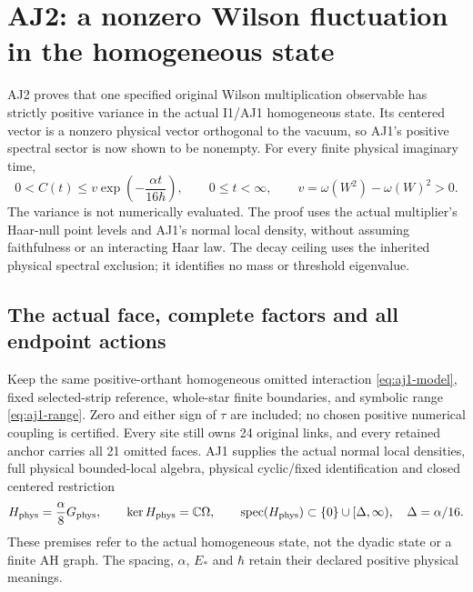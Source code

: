 \section{AJ2: a nonzero Wilson fluctuation in the homogeneous state\workstar}
\label{sec:aj2}
AJ2 proves that one specified original Wilson multiplication observable has strictly positive variance in the actual I1/AJ1 homogeneous state. Its centered vector is a nonzero physical vector orthogonal to the vacuum, so AJ1's positive spectral sector is now shown to be nonempty. For every finite physical imaginary time,
\begin{equation}
 0<C(t)\le v\exp\!\left(-\frac{\alpha t}{16\hbar}\right),
 \qquad0\le t<\infty,
 \qquad v=\omega(W^2)-\omega(W)^2>0.
 \label{eq:aj2-correlation}
\end{equation}
The variance is not numerically evaluated. The proof uses the actual multiplier's Haar-null point levels and AJ1's normal local density, without assuming faithfulness or an interacting Haar law. The decay ceiling uses the inherited physical spectral exclusion; it identifies no mass or threshold eigenvalue.

\subsection{The actual face, complete factors and all endpoint actions}
Keep the same positive-orthant homogeneous omitted interaction \eqref{eq:aj1-model}, fixed selected-strip reference, whole-star finite boundaries, and symbolic range \eqref{eq:aj1-range}. Zero and either sign of $\tau$ are included; no chosen positive numerical coupling is certified. Every site still owns 24 original links, and every retained anchor carries all 21 omitted faces. AJ1 supplies the actual normal local densities, full physical bounded-local algebra, physical cyclic/fixed identification and closed centered restriction
\begin{equation}
 H_{\rm phys}=\frac\alpha8G_{\rm phys},\qquad
 \ker H_{\rm phys}=\mathbb C\Omega,\qquad
 \operatorname{spec}(H_{\rm phys})\subset\{0\}\cup[\Delta,\infty),
 \quad\Delta=\alpha/16.
 \label{eq:aj2-inherited}
\end{equation}
These premises refer to the actual homogeneous state, not the dyadic state or a finite AH graph. The spacing, $\alpha$, $E_*$ and $\hbar$ retain their declared positive physical meanings.

